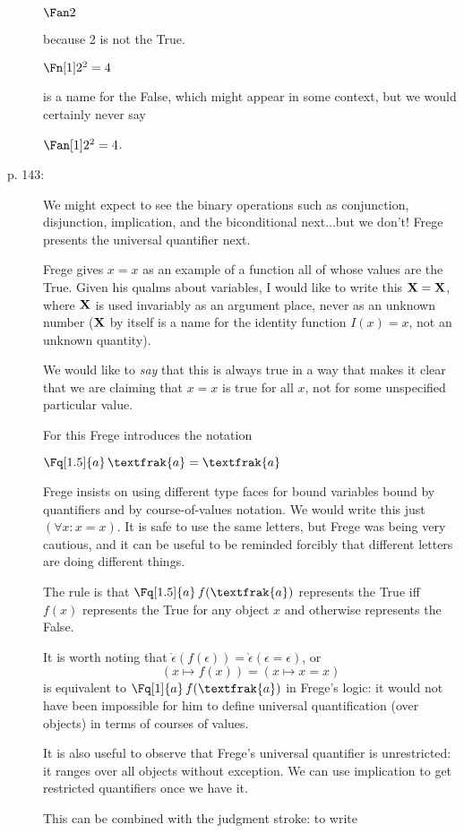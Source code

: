 \documentclass[12pt]{article}
\begin{document}
\begin{description}
$\Fan 2$

because 2 is not the True.

$\Fn[1] 2^2=4$ 

is a name for the False, which might appear in some context, but we would certainly never say

$\Fan[1] 2^2 = 4$.

\item[p. 143:]  We might expect to see the binary operations such as conjunction, disjunction, implication, and the biconditional next...but we don't!  Frege presents the universal quantifier next.

Frege gives $x=x$ as an example of a function all of whose values are the True.  Given his qualms about variables, I would like to write this ${\bf X}={\bf X}$, where $\bf X$ is used
invariably as an argument place, never as an unknown number ($\bf X$ by itself is a name for the identity function $I(x)=x$, not an unknown quantity).

We would like to {\em say\/} that this is always true in a way that makes it clear that we are claiming that $x=x$ is true for all $x$, not for some unspecified particular value.

For this Frege introduces the notation

$\Fq[1.5]{a}\, \textfrak{a}=\textfrak{a}$


Frege insists on using different type faces for bound variables bound by quantifiers and by course-of-values  notation.  We would write this just $(\forall x:x=x)$.  It is safe to use
the same letters, but Frege was being very cautious, and it can be useful to be reminded forcibly that different letters are doing different things.

The rule is that $\Fq[1.5]{a}\, f(\textfrak{a})$ represents the True iff $f(x)$ represents the True for any object $x$ and otherwise represents the False.

It is worth noting that $\grave{\epsilon}(f(\epsilon)) = \grave{\epsilon}(\epsilon=\epsilon)$, or $$(x \mapsto f(x)) = (x \mapsto x=x)$$ is equivalent to $\Fq[1]{a}\, f(\textfrak{a})$ in Frege's logic:  it would not have been impossible for him to define universal quantification (over objects) in terms of courses of values.

It is also useful to observe that Frege's universal quantifier is unrestricted:  it ranges over all objects without exception.  We can use implication to get restricted quantifiers once we have it.

This can be combined with the judgment stroke:  to write 


\end{description}
\end{document}
